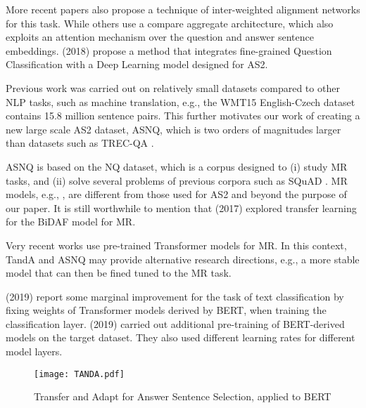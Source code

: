 \documentclass[letterpaper]{article} \usepackage{aaai20}  \usepackage{times}  \usepackage{helvet} \usepackage{courier}  \usepackage[hyphens]{url}  \usepackage{graphicx} \urlstyle{rm} \def\UrlFont{\rm}  \usepackage{graphicx}  \usepackage{todonotes}
\newcommand{\ASS}{AS2}
\newcommand{\TANDA}{T{\sc and}A}
\begin{document}
More recent papers \cite{shen-etal-2017-inter,tran-etal-2018-context,DBLP:journals/corr/abs-1806-00778} also propose a technique of inter-weighted alignment networks for this task. While others \cite{DBLP:journals/corr/WangJ16b,Bian:2017:CMD:3132847.3133089,DBLP:journals/corr/abs-1905-12897} use a compare aggregate architecture, which also exploits an attention mechanism over the question and answer sentence embeddings. \citeauthor{tayyar-madabushi-etal-2018-integrating} (2018) propose a method that integrates fine-grained Question Classification with a Deep Learning model designed for {\ASS}.

Previous work \cite{wang-etal-2007-jeopardy} was carried out on relatively small datasets compared to other NLP tasks, such as machine translation, e.g., the WMT15 English-Czech dataset \cite{luong2016acl_hybrid} contains 15.8 million sentence pairs. This further motivates our work of creating a new large scale AS2 dataset, ASNQ, which is two orders of magnitudes larger than datasets such as TREC-QA \cite{wang-etal-2007-jeopardy}. 

ASNQ is based on the NQ dataset, which is a corpus designed to (i) study MR tasks, and (ii)
solve several problems of previous corpora such as SQuAD \cite{DBLP:journals/corr/RajpurkarZLL16}. 
MR models, e.g., \cite{DBLP:journals/corr/SeoKFH16}, are different from those used for AS2 and beyond the purpose of our paper. It is still worthwhile to mention that \citeauthor{min-etal-2017-question} (2017) explored transfer learning for the BiDAF model for MR.

Very recent works \cite{DBLP:journals/corr/abs-1810-04805,yang-etal-2019-end-end} use pre-trained Transformer models for MR. In this context, {\TANDA} and ASNQ may provide alternative research directions, e.g., a more stable model that can then be fined tuned to the MR task. 

\citeauthor{Wang2019ToTO} (2019) report some marginal improvement for the task of text classification by fixing weights of Transformer models derived by BERT, when training the classification layer. \citeauthor{DBLP:journals/corr/abs-1905-05583} (2019) carried out additional pre-training of BERT-derived models on the target dataset. They also used different learning rates for different model layers.

\begin{figure*}[t]
    \texttt{[image: TANDA.pdf]}
\vspace{-1em}
    \caption{Transfer and Adapt for Answer Sentence Selection, applied to BERT}
    \label{fig:tanda}
\vspace{-.5em}
\end{figure*}
\end{document}

